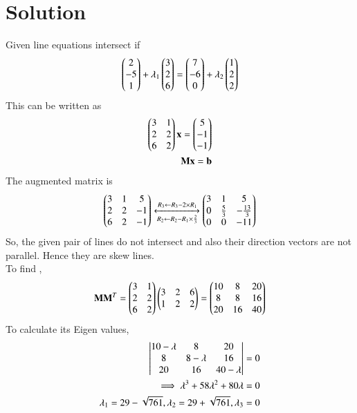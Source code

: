 \documentclass[journal,12pt,twocolumn]{IEEEtran}
\begin{document}
\section{Solution}
Given line equations intersect if
\begin{align}
 \begin{pmatrix}2\\-5\\1\end{pmatrix}+\lambda_1\begin{pmatrix}3\\2\\6\end{pmatrix}=\begin{pmatrix}7\\-6\\0\end{pmatrix}+\lambda_2\begin{pmatrix}1\\2\\2\end{pmatrix}
\end{align}
This can be written as 
\begin{align}
    \begin{pmatrix}3&1\\2&2\\6&2\end{pmatrix}\mathbf{x}=\begin{pmatrix}5\\-1\\-1\end{pmatrix}\\
    \mathbf{M}\mathbf{x}=\mathbf{b}
\end{align}
The augmented matrix is 
\begin{align}
    \begin{pmatrix}3&1&5\\2&2&-1\\6&2&-1\end{pmatrix}\xleftrightarrow[R_2\leftarrow R_2-R_1\times \frac{2}{3}]{R_3\leftarrow R_3-2\times R_1}\begin{pmatrix}3&1&5\\0&\frac{5}{3}&-\frac{13}{3}\\0&0&-11\end{pmatrix}
\end{align}
So, the given pair of lines do not intersect and also their direction vectors are not parallel. Hence they are skew lines.\\
To find ,
\begin{align}
    \mathbf{M}\mathbf{M}^T= \begin{pmatrix}3&1\\2&2\\6&2\end{pmatrix}\begin{pmatrix}3&2&6\\1&2&2\end{pmatrix}=\begin{pmatrix}10&8&20\\8&8&16\\20&16&40\end{pmatrix}
    \end{align}
    To calculate its Eigen values,
    \begin{align}
    \begin{vmatrix}10-\lambda&8&20\\8&8-\lambda&16\\20&16&40-\lambda\end{vmatrix}=0\\
    \implies \lambda^3+58\lambda^2+80\lambda=0\\
    \lambda_1=29-\sqrt{761},\lambda_2=29+\sqrt{761},\lambda_3=0
\end{align}
\end{document}
